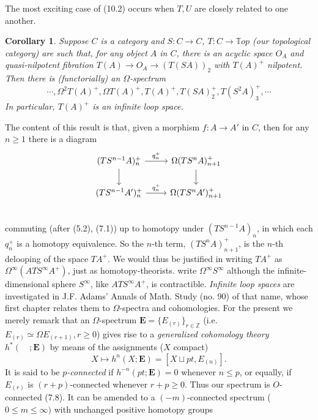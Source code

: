 \documentclass[openany,leqno]{book}  %
\newcommand{\Z}{\mathbb{Z}}
\newtheorem{corollary}[theorem]{Corollary}
\begin{document}
The most exciting case of (10.2) occurs when $T, U$ are closely related to one another.
\begin{corollary}
  Suppose $C$ is a category and $S \colon  C \longrightarrow C$, $T \colon   C\longrightarrow \mathbb{T}op$ (our topological
category) are such that, for any object $A$ in $C$, there is an acyclic space $O_A$ and quasi-nilpotent fibration $T(A)\longrightarrow O_A \longrightarrow (T(SA))_2$ with $T(A)^+$ nilpotent. Then there is (functorially) an $\Omega$-spectrum
\[\cdots, \Omega^2 T(A)^+, \Omega T(A)^+, T(A)^+,T(SA)_2^+ ,T(S^2A)_3^+ , \cdots\]
In particular, $T(A)^+$ is an infinite loop space.
\end{corollary}
The content of this result is that, given a morphism $f\colon   A \longrightarrow A'$ in $C$, then for any $n \geqslant 1$ there is a diagram
\[
\begin{tikzcd}
 (TS^{n-1}A)_n^+ \arrow[r,"q_n^+"] \arrow[d]& \Omega (TS^nA)_{n+1}^+ \arrow[d]   \\
(TS^{n-1}A')_n^+  \arrow[r,"q_n^+"] & \Omega (TS^nA')_{n+1}^+    \\
\end{tikzcd}
\]
commuting (after (5.2), (7.1)) up to homotopy under $(TS^{n-1} A)_n$, in which each $q_n^+$ is a homotopy equivalence. So the $n$-th term, $(TS^nA)_{n+1}^+$, is the $n$-th delooping of the space $TA^+$. We would thus be justified in writing $TA^+$ as $\Omega^{\infty}(ATS^{\infty}A^+)$, just as homotopy-theorists. write $\Omega^{\infty} S^{\infty}$ although the infinite-dimensional sphere $S^{\infty}$, like $ATS^{\infty}A^+$, is contractible. {\em Infinite loop spaces} are investigated in J.F. Adams' Annals of Math. Study (no. 90) of that name, whose first chapter relates them to $\Omega$-spectra and cohomologies. For the present we merely remark that an $\Omega$-spectrum $\mathbf{E} = \{E_{(r)}\}_{r\in \Z}$ (i.e.\ $E_{(r)}\simeq \Omega E_{(r+1)}, r \geqslant 0$) gives rise to a {\em generalized cohomology theory} $h^*(\quad ;\mathbf{E})$ by means of the assignments ($X$ compact)
\[X\mapsto h^n(X;\mathbf{E})=[X\sqcup pt,E_{(n)}].\]
It is said to be {\em $p$-connected} if $h^{-n}(pt;\mathbf{E})=0$ whenever $n \leqslant p$, or equally, if $E_{(r)}$ is $(r+p)$-connected whenever $r+p \geqslant 0$. Thus our spectrum is $O$-connected (7.8). It can be amended to a $(-m)$-connected spectrum ($0 \leqslant m \leqslant \infty)$ with unchanged positive homotopy groups
\end{document}
